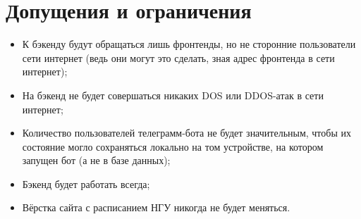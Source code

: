 \chapter{Допущения и ограничения}
	\label{chapter5}

	\begin{itemize}
		\item К бэкенду будут обращаться лишь фронтенды, но не сторонние пользователи сети интернет (ведь они могут это сделать, зная адрес фронтенда в сети интернет);
		
		\item На бэкенд не будет совершаться никаких DOS или DDOS-атак в сети интернет;
		
		\item Количество пользователей телеграмм-бота не будет значительным, чтобы их состояние могло сохраняться локально на том устройстве, на котором запущен бот (а не в базе данных);
		
		\item Бэкенд будет работать всегда;
		
		\item Вёрстка сайта с расписанием НГУ никогда не будет меняться.
	\end{itemize}
